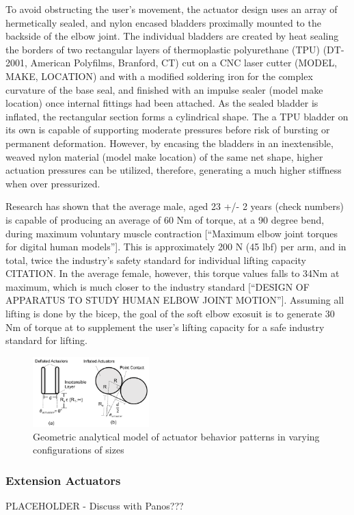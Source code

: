 \documentclass[letterpaper, 10 pt, conference]{ieeeconf}  %
\begin{document}
To avoid obstructing the user's movement, the actuator design uses an array of hermetically sealed, and nylon encased bladders proximally mounted to the backside of the elbow joint. The individual bladders are created by heat sealing the borders of two rectangular layers of thermoplastic polyurethane (TPU) (DT-2001, American Polyfilms, Branford, CT) cut on a CNC laser cutter (MODEL, MAKE, LOCATION) and  with a modified soldering iron for the complex curvature of the base seal, and finished with an impulse sealer (model make location) once internal fittings had been attached. As the sealed bladder is inflated, the rectangular section forms a cylindrical shape. The a TPU bladder on its own is capable of supporting moderate pressures before risk of bursting or permanent deformation. However, by encasing the bladders in an inextensible, weaved nylon material (model make location) of the same net shape, higher actuation pressures can be utilized, therefore, generating a much higher stiffness when over pressurized. 

Research has shown that the average male, aged 23 +/- 2 years (check numbers) is capable of producing an average of 60 Nm of torque, at a 90 degree bend, during maximum voluntary muscle contraction [“Maximum elbow joint torques for digital human models”]. This is approximately 200 N (45 lbf) per arm, and in total, twice the industry’s safety standard for individual lifting capacity {CITATION}. In the average female, however, this torque values falls to 34Nm at maximum, which is much closer to the industry standard [“DESIGN OF APPARATUS TO STUDY HUMAN ELBOW JOINT MOTION”]. Assuming all lifting is done by the bicep, the goal of the soft elbow exosuit is to generate 30 Nm of torque at to supplement the user’s lifting capacity for a safe industry standard for lifting.


\begin{figure}[t!]
\centering
\includegraphics[width=0.4\textwidth]{ActuatorModel1.PNG}
\caption{Geometric analytical model of actuator behavior patterns in varying configurations of sizes}
\label{fig:Model1}
\end{figure}

\subsubsection{Extension Actuators}
PLACEHOLDER - Discuss with Panos???
\end{document}
